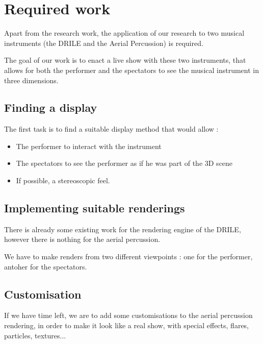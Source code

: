 \section{Required work}
Apart from the research work, the application of our research to two musical instruments (the DRILE and the Aerial Percussion) is required.

The goal of our work is to enact a live show with these two instruments, that allows for both the performer and the spectators to see the musical instrument in three dimensions.

\subsection{Finding a display}
The first task is to find a suitable display method that would allow : 
\begin{itemize}
\item The performer to interact with the instrument
\item The spectators to see the performer as if he was part of the 3D scene
\item If possible, a stereoscopic feel.
\end{itemize}

\subsection{Implementing suitable renderings}
There is already some existing work for the rendering engine of the DRILE, however there is nothing for the aerial percussion.

We have to make renders from two different viewpoints : one for the performer, antoher for the spectators.

\subsection{Customisation}
If we have time left, we are to add some customisations to the aerial percussion rendering, in order to make it look like a real show, with special effects, flares, particles, textures...